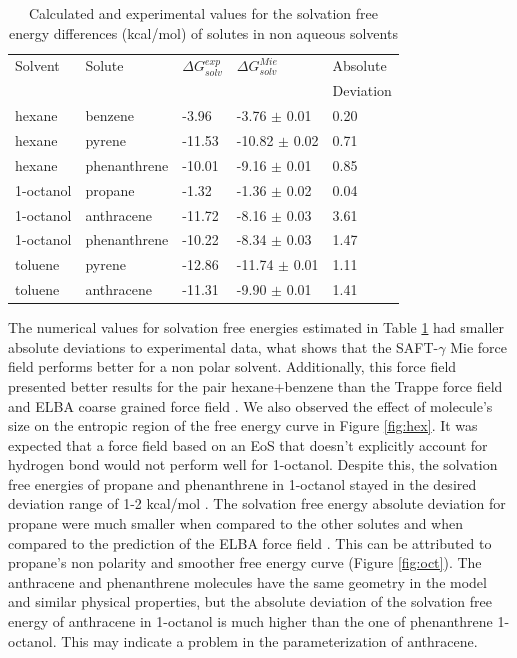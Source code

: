 \begin{table}[h]
\centering
  \caption{Calculated and experimental values for the solvation free energy differences (kcal/mol) of solutes in non aqueous solvents}
  \label{tbl:solv1}
  \begin{tabular}{lllll}
    \hline
      Solvent & Solute & $\Delta G_{solv}^{exp}$&  $\Delta G_{solv}^{Mie}$ & Absolute \\
      & & & & Deviation \\
    \hline
    hexane    & benzene      & -3.96  & -3.76  $\pm$ 0.01 & 0.20 \\
    hexane    & pyrene       & -11.53& -10.82 $\pm$ 0.02 & 0.71 \\
    hexane    & phenanthrene & -10.01& -9.16  $\pm$ 0.01 & 0.85 \\
    1-octanol & propane      & -1.32  & -1.36  $\pm$ 0.02 & 0.04 \\
    1-octanol & anthracene   & -11.72&  -8.16  $\pm$ 0.03 & 3.61 \\
    1-octanol & phenanthrene & -10.22&  -8.34  $\pm$ 0.03 & 1.47 \\
    toluene   & pyrene       & -12.86&  -11.74 $\pm$ 0.01 & 1.11\\
    toluene   & anthracene   & -11.31&  -9.90 $\pm$ 0.01 & 1.41\\
    \hline
  \end{tabular}
\end{table}
\FloatBarrier

The numerical values for solvation free energies estimated in Table \ref{tbl:solv1} had smaller absolute deviations to experimental data, what shows that the SAFT-$\gamma$ Mie force field performs better for a non polar solvent. Additionally, this force field presented better results for the pair hexane+benzene than the Trappe force field \cite{garrido2011} and ELBA coarse grained force field \cite{doi:10.1021/acs.jctc.5b00963}. We also observed the effect of molecule's size on the entropic region of the free energy curve in Figure \ref{fig:hex}. It was expected that a force field based on an EoS that doesn't explicitly account for hydrogen bond would not perform well for 1-octanol. Despite this, the solvation free energies of propane and phenanthrene in 1-octanol stayed in the desired deviation range of 1-2 kcal/mol \cite{doimobley}. The solvation free energy absolute deviation for propane were much smaller when compared to the other solutes and when compared to the prediction of the ELBA force field \cite{doi:10.1021/acs.jctc.5b00963}. This can be attributed to propane's non polarity and smoother free energy curve (Figure \ref{fig:oct}). The anthracene and phenanthrene molecules have the same geometry in the model and similar physical properties, but the absolute deviation of the solvation free energy of anthracene in 1-octanol is much higher than the one of phenanthrene 1-octanol. This may indicate a problem in the parameterization of anthracene.     

